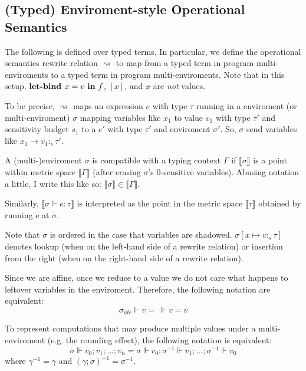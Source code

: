 \subsection{(Typed) Enviroment-style Operational Semantics}
The following is defined over typed terms. In particular, we define the
operational semantics rewrite relation $\rightsquigarrow$ to map from a typed
term in program multi-enviroments to a typed term in program multi-enviroments. Note
that in this setup, $\textbf{let-bind } x = v \ \textbf{in} \ f$, $[x]$, and $x$ are \textit{not}
values.

To be precise, $\rightsquigarrow$ maps an expression $e$ with type $\tau$
running in a enviroment (or multi-enviroment) $\sigma$ mapping variables like
$x_1$ to value $v_1$ with type $\tau'$ and sensitivity budget $s_1$ to a $e'$
with type $\tau'$ and enviroment $\sigma'$. So, $\sigma$ send variables like
$x_1 \to v_1 :_s \tau'$.

A (multi-)enviroment $\sigma$ is compatible with a typing context $\Gamma$ if
$\llbracket \sigma \rrbracket$ is a point within metric space $\llbracket \Gamma
\rrbracket$ (after erasing $\sigma$'s $0$-sensitive variables). Abusing notation
a little, I write this like so: $\llbracket \sigma \rrbracket \in \llbracket
\Gamma \rrbracket$.


Similarly, $\llbracket \sigma \Vdash e : \tau \rrbracket$ is
interpreted as the point in the metric space $\llbracket \tau \rrbracket$
obtained by running e at $\sigma$.

Note that $\sigma$ is ordered in the case that variables are shadowed. $\sigma[x
\mapsto v :_s \tau]$ denotes lookup (when on the left-hand side of a rewrite
relation) or insertion from the right (when on the right-hand side of a rewrite
relation).

Since we are affine, once we reduce to a value we do not care what happens to
leftover variables in the enviroment. Therefore, the following notation are
equivalent:
$$
\sigma_{idc} \Vdash v = \ \Vdash v = v
$$

To represent computations that may produce multiple values under a
multi-enviroment (e.g. the rounding effect), the following notation is
equivalent:
$$
\sigma \Vdash v_0;v_1;...;v_n = \sigma \Vdash v_0;\sigma^{-1} \Vdash v_1;...; \sigma^{-1} \Vdash v_0
$$
where
$\gamma^{-1} = \gamma$ and $(\gamma;\sigma)^{-1} = \sigma^{-1}$.

